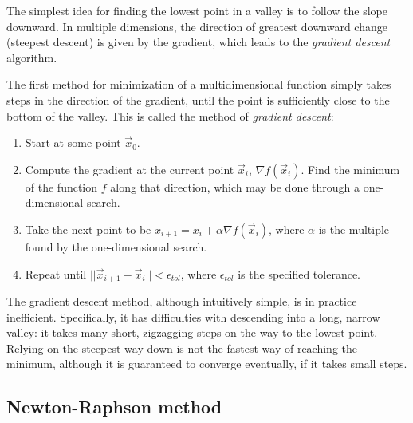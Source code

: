 \documentclass[
  letterpaper,
  DIV=11,
  numbers=noendperiod]{scrreprt}
\begin{document}
The simplest idea for finding the lowest point in a valley is to follow
the slope downward. In multiple dimensions, the direction of greatest
downward change (steepest descent) is given by the gradient, which leads
to the \emph{gradient descent} algorithm.

The first method for minimization of a multidimensional function simply
takes steps in the direction of the gradient, until the point is
sufficiently close to the bottom of the valley. This is called the
method of \emph{gradient descent}:

\begin{tcolorbox}[enhanced jigsaw, bottomtitle=1mm, coltitle=black, colbacktitle=quarto-callout-note-color!10!white, toprule=.15mm, leftrule=.75mm, titlerule=0mm, breakable, bottomrule=.15mm, arc=.35mm, opacitybacktitle=0.6, opacityback=0, colframe=quarto-callout-note-color-frame, left=2mm, toptitle=1mm, rightrule=.15mm, title=\textcolor{quarto-callout-note-color}{\faInfo}\hspace{0.5em}{Gradient descent algorithm}, colback=white]

\begin{enumerate}
\def\labelenumi{\arabic{enumi}.}
\item
  Start at some point \(\vec x_0\).
\item
  Compute the gradient at the current point \(\vec x_i\),
  \(\nabla f (\vec x_i)\). Find the minimum of the function \(f\) along
  that direction, which may be done through a one-dimensional search.
\item
  Take the next point to be
  \(x_{i+1} = x_i + \alpha \nabla f (\vec x_i)\), where \(\alpha\) is
  the multiple found by the one-dimensional search.
\item
  Repeat until \(|| \vec x_{i+1} - \vec x_i || < \epsilon_{tol}\), where
  \(\epsilon_{tol}\) is the specified tolerance.
\end{enumerate}

\end{tcolorbox}

The gradient descent method, although intuitively simple, is in practice
inefficient. Specifically, it has difficulties with descending into a
long, narrow valley: it takes many short, zigzagging steps on the way to
the lowest point. Relying on the steepest way down is not the fastest
way of reaching the minimum, although it is guaranteed to converge
eventually, if it takes small steps.

\subsection{Newton-Raphson method}\label{newton-raphson-method-1}
\end{document}
